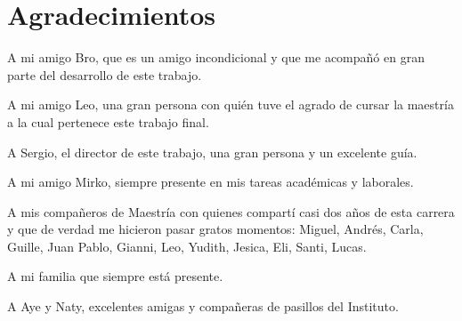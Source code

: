 \chapter*{Agradecimientos}
\label{chap:agradecimientos}

A mi amigo Bro, que es un amigo incondicional y que me acompañó en gran parte del desarrollo de este trabajo.

A mi amigo Leo, una gran persona con quién tuve el agrado de cursar la maestría a la cual pertenece este trabajo final.

A Sergio, el director de este trabajo, una gran persona y un excelente guía.

A mi amigo Mirko, siempre presente en mis tareas académicas y laborales.

A mis compañeros de Maestría con quienes compartí casi dos años de esta carrera y que de verdad me hicieron pasar gratos momentos: Miguel, Andrés, Carla, Guille, Juan Pablo, Gianni, Leo, Yudith, Jesica, Eli, Santi, Lucas.

A mi familia que siempre está presente.

A Aye y Naty, excelentes amigas y compañeras de pasillos del Instituto.
